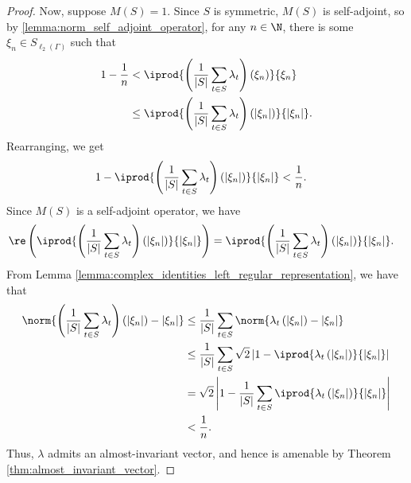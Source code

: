 \begin{proof}
  Now, suppose $M(S) = 1$. Since $S$ is symmetric, $M(S)$ is self-adjoint, so by \ref{lemma:norm_self_adjoint_operator}, for any $n\in \N$, there is some $\xi_n\in S_{\ell_2\left( \Gamma \right)}$ such that
  \begin{align*}
    1-\frac{1}{n} &< \iprod{\left( \frac{1}{\left\vert S \right\vert}\sum_{t\in S}\lambda_t \right)\left( \xi_n \right)}{\xi_n}\\
                  &\leq \iprod{\left( \frac{1}{\left\vert S \right\vert}\sum_{t\in S}\lambda_t \right)\left( \left\vert \xi_n \right\vert \right)}{\left\vert \xi_n \right\vert}.
  \end{align*}
  Rearranging, we get
  \begin{align*}
    1- \iprod{\left( \frac{1}{\left\vert S \right\vert}\sum_{t\in S}\lambda_t \right)\left( \left\vert \xi_n \right\vert \right)}{\left\vert \xi_n \right\vert} &< \frac{1}{n}.
  \end{align*}
  Since $M(S)$ is a self-adjoint operator, we have
  \begin{align*}
    \re\left( \iprod{\left( \frac{1}{\left\vert S \right\vert}\sum_{t\in S}\lambda_t \right)\left( \left\vert \xi_n \right\vert \right)}{\left\vert \xi_n \right\vert} \right) &= \iprod{\left( \frac{1}{\left\vert S \right\vert}\sum_{t\in S}\lambda_t \right)\left( \left\vert \xi_n \right\vert \right)}{\left\vert \xi_n \right\vert}.
  \end{align*}
  From Lemma \ref{lemma:complex_identities_left_regular_representation}, we have that
  \begin{align*}
    \norm{\left( \frac{1}{\left\vert S \right\vert}\sum_{t\in S}\lambda_t \right)\left( \left\vert \xi_n \right\vert \right) - \left\vert \xi_n \right\vert} &\leq \frac{1}{\left\vert S \right\vert}\sum_{t\in S}\norm{\lambda_t\left( \left\vert \xi_n \right\vert \right) - \left\vert \xi_n \right\vert}\\
                                                                                                                                                                    &\leq \frac{1}{\left\vert S \right\vert}\sum_{t\in S}\sqrt{2} \left\vert 1 - \iprod{\lambda_t\left( \left\vert \xi_n \right\vert \right)}{\left\vert \xi_n \right\vert} \right\vert\\
                                                                                                                                                                    &= \sqrt{2}\left\vert 1 - \frac{1}{\left\vert S \right\vert} \sum_{t\in S} \iprod{\lambda_t\left( \left\vert \xi_n \right\vert \right)}{\left\vert \xi_n \right\vert} \right\vert\\
                                                                                                                                                                    &< \frac{1}{n}.
  \end{align*}
  Thus, $\lambda$ admits an almost-invariant vector, and hence is amenable by Theorem \ref{thm:almost_invariant_vector}.
\end{proof}
